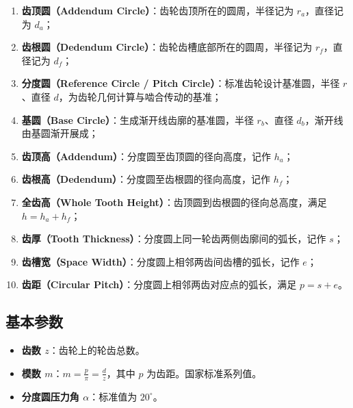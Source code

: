 \begin{enumerate}
	\item \textbf{齿顶圆（Addendum Circle）}：齿轮齿顶所在的圆周，半径记为 $r_a$，直径记为 $d_a$；
	\item \textbf{齿根圆（Dedendum Circle）}：齿轮齿槽底部所在的圆周，半径记为 $r_f$，直径记为 $d_f$；
	\item \textbf{分度圆（Reference Circle / Pitch Circle）}：标准齿轮设计基准圆，半径 $r$、直径 $d$，为齿轮几何计算与啮合传动的基准；
	\item \textbf{基圆（Base Circle）}：生成渐开线齿廓的基准圆，半径 $r_b$、直径 $d_b$，渐开线由基圆渐开展成；
	\item \textbf{齿顶高（Addendum）}：分度圆至齿顶圆的径向高度，记作 $h_a$；
	\item \textbf{齿根高（Dedendum）}：分度圆至齿根圆的径向高度，记作 $h_f$；
	\item \textbf{全齿高（Whole Tooth Height）}：齿顶圆到齿根圆的径向总高度，满足 $h = h_a + h_f$；
	\item \textbf{齿厚（Tooth Thickness）}：分度圆上同一轮齿两侧齿廓间的弧长，记作 $s$；
	\item \textbf{齿槽宽（Space Width）}：分度圆上相邻两齿间齿槽的弧长，记作 $e$；
	\item \textbf{齿距（Circular Pitch）}：分度圆上相邻两齿对应点的弧长，满足 $p = s + e$。
\end{enumerate}
\subsection{基本参数}
\begin{itemize}
	\item \textbf{齿数 $z$}：齿轮上的轮齿总数。
	\item \textbf{模数 $m$}：$m = \frac{p}{\pi}= \frac{d}{z}$，其中 $p$ 为齿距。国家标准系列值。
	\item \textbf{分度圆压力角 $\alpha$}：标准值为 $20^\circ$。
\end{itemize}

